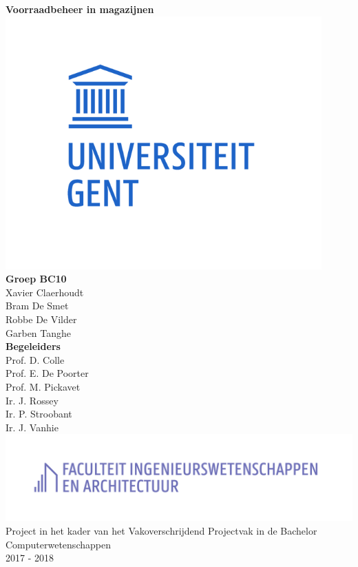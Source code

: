 \documentclass[a4paper,12pt]{report}
\begin{document}
	
\begin{titlepage}
	\centering
	\vfill
	
	{\Huge \textbf{Voorraadbeheer in magazijnen}}\\
	\includegraphics{UGent_Logo.png}\\
	{\large \textbf{Groep BC10}}\\
	\vspace{4mm}
	Xavier Claerhoudt\\
	\vspace{2mm}
	Bram De Smet\\
	\vspace{2mm}
	Robbe De Vilder\\
	\vspace{2mm}
	Garben Tanghe\\
	\vspace{8mm}
	{\large \textbf{Begeleiders}}\\
	\vspace{4mm}
	Prof. D. Colle\\
	Prof. E. De Poorter\\
	Prof. M. Pickavet\\
	Ir. J. Rossey\\
	Ir. P. Stroobant\\
	Ir. J. Vanhie\\
	\includegraphics{UGent_FEA_Logo.png}\\
	{\footnotesize Project in het kader van het Vakoverschrijdend Projectvak in de Bachelor Computerwetenschappen}\\
	\vspace{4mm}
	2017 - 2018
	
	\vfill
\end{titlepage}
\end{document}
